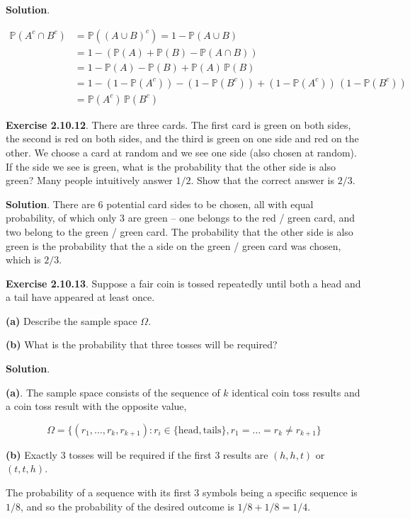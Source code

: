 \textbf{Solution}.

\begin{align*}
\mathbb{P}(A^{c} \cap B^{c}) 
&= \mathbb{P}((A \cup B)^{c})  = 1 - \mathbb{P}(A \cup B) 
\\
&= 1 - \left( \mathbb{P}(A) + \mathbb{P}(B) - \mathbb{P}(A \cap B) \right)  
\\
&= 1 - \mathbb{P}(A) - \mathbb{P}(B) + \mathbb{P}(A) \, \mathbb{P}(B) 
\\
&= 1 - (1 - \mathbb{P}(A^{c})) 
     - (1 - \mathbb{P}(B^{c})) 
     + (1 - \mathbb{P}(A^{c})) \, (1 - \mathbb{P}(B^{c})) 
\\
&= \mathbb{P}(A^{c}) \, \mathbb{P}(B^{c})
\end{align*}

\textbf{Exercise 2.10.12}. There are three cards. The first card is
green on both sides, the second is red on both sides, and the third is
green on one side and red on the other. We choose a card at random and
we see one side (also chosen at random). If the side we see is green,
what is the probability that the other side is also green? Many people
intuitively answer $1/2$. Show that the correct answer is $2/3$.

\textbf{Solution}. There are 6 potential card sides to be chosen, all
with equal probability, of which only 3 are green -- one belongs to the
red / green card, and two belong to the green / green card. The
probability that the other side is also green is the probability that
the a side on the green / green card was chosen, which is $2/3$.

\textbf{Exercise 2.10.13}. Suppose a fair coin is tossed repeatedly
until both a head and a tail have appeared at least once.

\textbf{(a)} Describe the sample space \(\Omega\).

\textbf{(b)} What is the probability that three tosses will be required?

\textbf{Solution}.

\textbf{(a)}. The sample space consists of the sequence of \(k\)
identical coin toss results and a coin toss result with the opposite
value,

\[ \Omega = \{ (r_{1}, \dots, r_{k}, r_{k+1}) : r_{i} \in \{ \text{head}, \text{tails} \}, r_{1} = \dots = r_{k} \neq r_{k + 1} \} \]

\textbf{(b)} Exactly 3 tosses will be required if the first 3 results
are \((h, h, t)\) or \((t, t, h)\).

The probability of a sequence with its first $3$ symbols being a specific 
sequence is $1/8$, and so the probability of the desired outcome is 
$1/8 + 1/8 = 1/4$.

